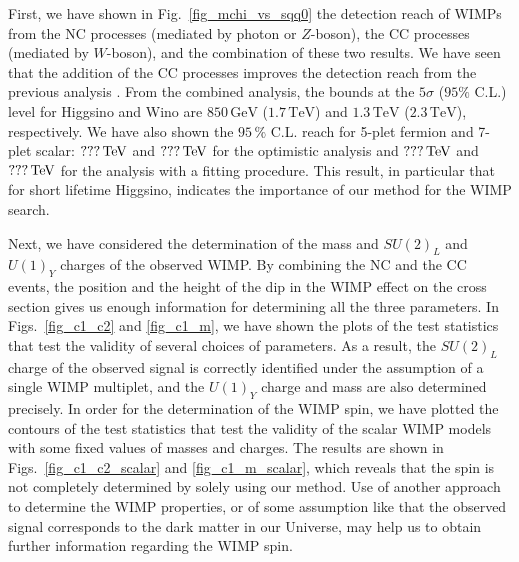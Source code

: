 \documentclass[12pt,twoside,book]{article}
\begin{document}
First, we have shown in Fig.~\ref{fig_mchi_vs_sqq0} the detection reach of WIMPs from the NC processes (mediated by photon or $Z$-boson), the CC processes (mediated by $W$-boson), and the combination of these two results.
We have seen that the addition of the CC processes improves the detection reach from the previous analysis \cite{Chigusa:2018vxz}.
From the combined analysis, the bounds at the $5\sigma$ ($95\%$ C.L.) level for Higgsino and Wino are $850\,\mathrm{GeV}$ ($1.7\,\mathrm{TeV}$) and $1.3\,\mathrm{TeV}$ ($2.3\,\mathrm{TeV}$), respectively.
We have also shown the $95\,\%$ C.L. reach for 5-plet fermion and 7-plet scalar: $???\,{\rm TeV}$ and $???\,{\rm TeV}$ for the optimistic analysis and $???\,{\rm TeV}$ and $???\,{\rm TeV}$ for the analysis with a fitting procedure.
This result, in particular that for short lifetime Higgsino, indicates the importance of our method for the WIMP search.

Next, we have considered the determination of the mass and $SU(2)_L$ and $U(1)_Y$ charges of the observed WIMP.
By combining the NC and the CC events, the position and the height of the dip in the WIMP effect on the cross section gives us enough information for determining all the three parameters.
In Figs.~\ref{fig_c1_c2} and \ref{fig_c1_m}, we have shown the plots of the test statistics that test the validity of several choices of parameters.
As a result, the $SU(2)_L$ charge of the observed signal is correctly identified under the assumption of a single WIMP multiplet, and the $U(1)_Y$ charge and mass are also determined precisely.
In order for the determination of the WIMP spin, we have plotted the contours of the test statistics that test the validity of the scalar WIMP models with some fixed values of masses and charges.
The results are shown in Figs.~\ref{fig_c1_c2_scalar} and \ref{fig_c1_m_scalar}, which reveals that the spin is not completely determined by solely using our method.
Use of another approach to determine the WIMP properties, or of some assumption like that the observed signal corresponds to the dark matter in our Universe, may help us to obtain further information regarding the WIMP spin.




\end{document}
